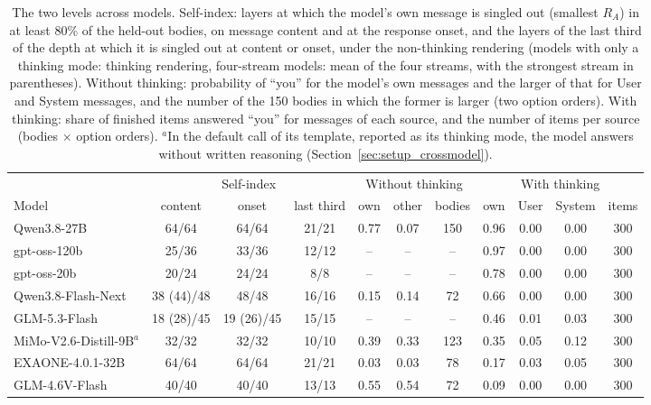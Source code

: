 \begin{table}[htbp]
\centering
\caption{The two levels across models. Self-index: layers at which the model's own message is singled out (smallest \(R_A\)) in at least 80\% of the held-out bodies, on message content and at the response onset, and the layers of the last third of the depth at which it is singled out at content or onset, under the non-thinking rendering (models with only a thinking mode: thinking rendering, four-stream models: mean of the four streams, with the strongest stream in parentheses). Without thinking: probability of ``you'' for the model's own messages and the larger of that for User and System messages, and the number of the 150 bodies in which the former is larger (two option orders). With thinking: share of finished items answered ``you'' for messages of each source, and the number of items per source (bodies \(\times\) option orders). $^{a}$In the default call of its template, reported as its thinking mode, the model answers without written reasoning (Section~\ref{sec:setup_crossmodel}).}
\label{tab:self_crossmodel}
\footnotesize
\setlength{\tabcolsep}{3.2pt}
\begin{tabular}{lcccccccccc}
\toprule
& \multicolumn{3}{c}{Self-index} & \multicolumn{3}{c}{Without thinking} & \multicolumn{4}{c}{With thinking} \\
\cmidrule(lr){2-4}\cmidrule(lr){5-7}\cmidrule(lr){8-11}
Model & content & onset & last third & own & other & bodies & own & User & System & items \\
\midrule
Qwen3.8-27B & 64/64 & 64/64 & 21/21 & 0.77 & 0.07 & 150 & 0.96 & 0.00 & 0.00 & 300 \\
gpt-oss-120b & 25/36 & 33/36 & 12/12 & -- & -- & -- & 0.97 & 0.00 & 0.00 & 300 \\
gpt-oss-20b & 20/24 & 24/24 & 8/8 & -- & -- & -- & 0.78 & 0.00 & 0.00 & 300 \\
Qwen3.8-Flash-Next & 38 (44)/48 & 48/48 & 16/16 & 0.15 & 0.14 & 72 & 0.66 & 0.00 & 0.00 & 300 \\
GLM-5.3-Flash & 18 (28)/45 & 19 (26)/45 & 15/15 & -- & -- & -- & 0.46 & 0.01 & 0.03 & 300 \\
MiMo-V2.6-Distill-9B$^{a}$ & 32/32 & 32/32 & 10/10 & 0.39 & 0.33 & 123 & 0.35 & 0.05 & 0.12 & 300 \\
EXAONE-4.0.1-32B & 64/64 & 64/64 & 21/21 & 0.03 & 0.03 & 78 & 0.17 & 0.03 & 0.05 & 300 \\
GLM-4.6V-Flash & 40/40 & 40/40 & 13/13 & 0.55 & 0.54 & 72 & 0.09 & 0.00 & 0.00 & 300 \\

\end{tabular}
\end{table}
